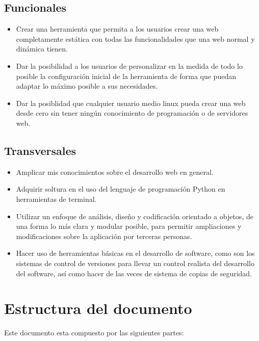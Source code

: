 \subsection{Funcionales}
\begin{itemize}
\item Crear una herramienta que permita a los usuarios crear una web completamente estática
con todas las funcionalidades que una web normal y dinámica tienen.
\item Dar la posibilidad a los usuarios de personalizar en la medida de todo lo posible la configuración
inicial de la herramienta de forma que puedan adaptar lo máximo posible a sus necesidades.
\item Dar la posiblidad que cualquier usuario medio linux pueda crear una web desde cero sin tener
ningún conocimiento de programación o de servidores web.
\end{itemize}

\subsection{Transversales}
\begin{itemize}
\item Amplicar mis conocimientos sobre el desarrollo web en general.
\item Adquirir soltura en el uso del lenguaje de programación Python en herramientas de terminal.
\item Utilizar un enfoque de análisis, diseño y codificación orientado a objetos,
de una forma lo más clara y modular posible, para permitir ampliaciones y
modificaciones sobre la aplicación por terceras personas.
\item Hacer uso de herramientas básicas en el desarrollo de software, como son los
sistemas de control de versiones para llevar un control realista del desarrollo
del software, así como hacer de las veces de sistema de copias de seguridad.
\end{itemize}

\section{Estructura del documento}

Este documento esta compuesto por las siguientes partes:


